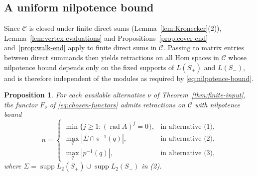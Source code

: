 \documentclass[a4paper,reqno,10pt]{amsart}
\newtheorem{proposition}[theorem]{Proposition}
\theoremstyle{definition}
\DeclareMathOperator{\rad}{rad}
\DeclareMathOperator{\supp}{supp}
\newcommand{\C}{\mathcal C}
\numberwithin{equation}{section}
\begin{document}
\subsection{A uniform nilpotence bound}
\label{sec:uniform}
Since $\C$ is closed under finite direct sums
(Lemma~\ref{lem:Kronecker}(2)), Lemma~\ref{lem:vertex-evaluations} and
Propositions~\ref{prop:cover-end} and~\ref{prop:walk-end} apply to finite
direct sums in $\C$. Passing to matrix entries between direct summands
then yields retractions on all Hom spaces in $\C$ whose nilpotence bound
depends only on the fixed supports of $L(S_+)$ and $L(S_-)$, and is therefore
independent of the modules as required by \eqref{eq:nilpotence-bound}.

\begin{proposition}\label{prop:finite-control}
For each available alternative $\nu$ of Theorem~\ref{thm:finite-input},
the functor $F_\nu$ of \eqref{eq:chosen-functors} admits retractions
on $\C$ with nilpotence bound
\[
 n=\begin{cases}
 \min\{j\ge1:(\rad A)^j=0\},&\text{in alternative (1)},\\
 \max_q|\Sigma\cap\pi^{-1}(q)|,&\text{in alternative (2)},\\
 \max_q|p^{-1}(q)|,&\text{in alternative (3)},
 \end{cases}
\]
where $\Sigma=\supp L_2(S_+)\cup\supp L_2(S_-)$ in (2).
\end{proposition}
\end{document}
